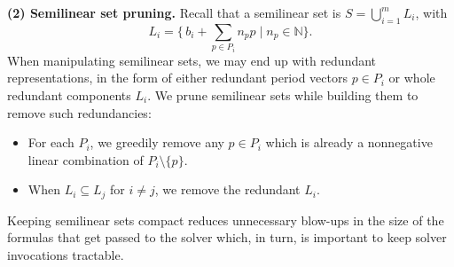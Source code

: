 

\medskip
\noindent
\textbf{(2) Semilinear set pruning.}  
Recall that a semilinear set is $S=\bigcup_{i=1}^m L_i$, with
\[
\displaystyle L_i=\Big\{\,b_i+\sum_{p\in P_i}n_p p \;\Big\vert\; n_p\in\mathbb N\Big\}.
\]
When manipulating semilinear sets, we may end up with redundant representations, in the form of either
redundant period vectors $p \in P_i$ or whole redundant components $L_i$.
%
We prune semilinear sets while building them to remove such redundancies:
\begin{itemize}
  \item For each $P_i$, we greedily remove any $p \in P_i$ which is already a
    nonnegative linear combination of $P_i \setminus \{p\}$.
  \item When $L_i \subseteq L_j$ for $i \neq j$, we remove the redundant $L_i$.
\end{itemize}
Keeping semilinear sets compact reduces unnecessary blow-ups in the size of the formulas that get passed to the solver which, in turn, is important to keep solver invocations tractable.



